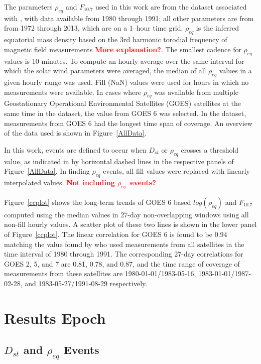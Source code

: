 \documentclass[10pt,twocolumn]{article}
\newcommand{\vinote}[1]{\textcolor{red}{\textbf{#1}}} %
\newcommand{\req}{\ensuremath{\rho_{eq}}}
\newcommand{\inote}[1]{\textcolor{blue}{\textbf{#1}}} %
\def\note#1\par{\textcolor{blue}{\textbf{#1}}\\}
\begin{document}
The parameters $\rho_{eq}$ and $F_{10.7}$ used in this work are from the dataset associated with \cite{Denton}, with data available from 1980 through 1991; all other parameters are from \cite{Kondrashov2014ReconstructionOfGaps} from 1972 through 2013, which are on a 1--hour time grid. $\rho_{eq}$ is the inferred equatorial mass density based on the 3rd harmonic torodial frequency of magnetic field measurements \vinote{More explanation?}.  The smallest cadence for $\rho_{eq}$ values is 10 minutes.  To compute an hourly average over the same interval for which the solar wind parameters were averaged, the median of all $\rho_{eq}$ values in a given hourly range was used.  Fill (NaN) values were used for hours in which no measurements were available.  In cases where $\rho_{eq}$ was available from multiple Geostationary Operational Environmental Satellites (GOES) satellites at the same time in the \cite{Denton} dataset, the value from GOES 6 was selected.  In the dataset, measurements from GOES 6 had the longest time span of coverage.  An overview of the data used is shown in Figure~\ref{AllData}.

In this work, events are defined to occur when $D_{st}$ or $\rho_{eq}$ crosses a threshold value, as indicated in by horizontal dashed lines in the respective panels of Figure~\ref{AllData}.  In finding $\rho_{eq}$ events, all fill values were replaced with linearly interpolated values. \vinote{Not including \req\ events?}

Figure~\ref{ccplot} shows the long-term trends of GOES 6 based $log(\rho_{eq})$ and $F_{10.7}$ computed using the median values in 27-day non-overlapping windows using all non-fill hourly values.  A scatter plot of these two lines is shown in the lower panel of Figure~\ref{ccplot}.  The linear correlation for GOES 6 is found to be $0.94$ matching the value found by \cite{Takahashi2010} who used measurements from all satellites in the time interval of 1980 through 1991.  The corresponding 27-day correlations for GOES 2, 5, and 7 are 0.81, 0.78, and 0.87, and the time range of coverage of measurements from these satellites are 1980-01-01/1983-05-16, 1983-01-01/1987-02-28, and 1983-05-27/1991-08-29 respectively.


\section{Results Epoch}

\subsection{$D_{st}$ and $\rho_{eq}$ Events}
\end{document}
